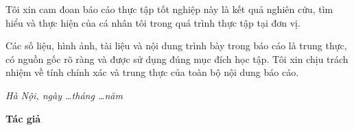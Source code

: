 
Tôi xin cam đoan báo cáo thực tập tốt nghiệp này là kết quả nghiên cứu, tìm hiểu và thực hiện của cá nhân tôi trong quá trình thực tập tại đơn vị.

Các số liệu, hình ảnh, tài liệu và nội dung trình bày trong báo cáo là trung thực, có nguồn gốc rõ ràng và được sử dụng đúng mục đích học tập. Tôi xin chịu trách nhiệm về tính chính xác và trung thực của toàn bộ nội dung báo cáo.

\vspace{1cm}

\begin{flushright}
\begin{minipage}{8cm}
\centering
\textit{Hà Nội, ngày \ldots tháng \ldots năm \Nam}

\vspace{0.5cm}

\textbf{Tác giả}

\vspace{2cm}

\textbf{\TenSinhVien}
\end{minipage}
\end{flushright}
